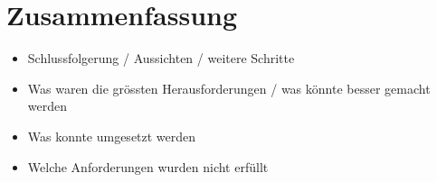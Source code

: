 \section*{Zusammenfassung}

\begin{itemize}  
\item Schlussfolgerung / Aussichten / weitere Schritte
\item Was waren die grössten Herausforderungen / was könnte besser gemacht werden
\item Was konnte umgesetzt werden
\item  Welche Anforderungen wurden nicht erfüllt
\end{itemize}